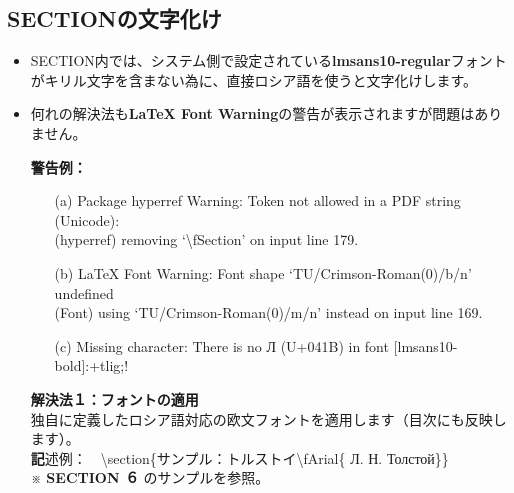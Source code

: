 \documentclass[a4paper,10pt]{ltjsarticle}
\def\colH#1{\color[HTML]{#1}}
\def\bs{\textbackslash }
\begin{document}
\subsection{SECTIONの文字化け}
\begin{itemize}
  \item SECTION内では、システム側で設定されている\textbf{lmsans10-regular}フォントがキリル文字を含まない為に、直接ロシア語を使うと文字化けします。
  \item 何れの解決法も\textbf{LaTeX Font Warning}の警告が表示されますが問題はありません。  \vspace{2mm}
\begin{spacing}{0.8}
\textbf{警告例：}
\begin{itemize}
  \item[(a)] Package hyperref Warning: Token not allowed in a PDF string (Unicode):\\
(hyperref) removing `\bs fSection' on input line 179.
  \item[(b)] LaTeX Font Warning: Font shape `TU/Crimson-Roman(0)/b/n' undefined\\
(Font)              using `TU/Crimson-Roman(0)/m/n' instead on input line 169.
  \item[(c)] Missing character: There is no Л (U+041B) in font [lmsans10-bold]:+tlig;!
\end{itemize}
\end{spacing}\vspace{2mm}
  \item[]\textbf{解決法１：フォントの適用}\\
  独自に定義したロシア語対応の欧文フォントを適用します（目次にも反映します）。\\
{\textbf 記述例：　}\bs section\{サンプル：トルストイ{\colH{800000}\bs fArial\{} Л. Н. Толстой{\colH{800000}\}}\}\hspace{3mm}\\
※ \textbf{SECTION ６} のサンプルを参照。\vspace{2mm}


\end{itemize}
\end{document}

